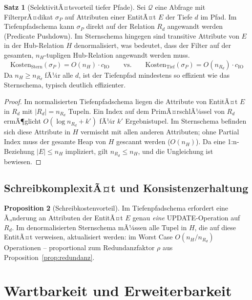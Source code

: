 ﻿\documentclass[a4paper,12pt]{report}
\theoremstyle{definition}
\newtheorem{theorem}{Satz}[chapter]
\newtheorem{proposition}[theorem]{Proposition}
\theoremstyle{remark}
\begin{document}
\begin{theorem}[SelektivitÃ¤tsvorteil tiefer Pfade]
\label{thm:selektivitaet}
Sei $\mathcal{Q}$ eine Abfrage mit FilterprÃ¤dikat $\sigma_P$ auf Attributen
einer EntitÃ¤t $E$ der Tiefe $d$ im Pfad. Im Tiefenpfadschema kann $\sigma_P$
direkt auf der Relation $R_d$ angewandt werden (Predicate Pushdown).
Im Sternschema hingegen sind transitive Attribute von $E$ in der Hub-Relation
$H$ de\-normalisiert, was bedeutet, dass der Filter auf der gesamten,
$n_H$-tupligen Hub-Relation angewandt werden muss.
\[
  \text{Kosten}_{\text{Stern}}(\sigma_P) = O(n_H) \cdot c_{\text{IO}}
  \qquad\text{vs.}\qquad
  \text{Kosten}_{\text{Tief}}(\sigma_P) = O(n_{R_d}) \cdot c_{\text{IO}}
\]
Da $n_H \geq n_{R_d}$ fÃ¼r alle $d$, ist der Tiefenpfad mindestens so
effizient wie das Sternschema, typisch deutlich effizienter.
\end{theorem}

\begin{proof}
Im normalisierten Tiefenpfadschema liegen die Attribute von EntitÃ¤t $E$ in
$R_d$ mit $|R_d| = n_{R_d}$ Tupeln. Ein Index auf dem PrimÃ¤rschlÃ¼ssel von
$R_d$ ermÃ¶glicht $O(\log n_{R_d} + k')$ fÃ¼r $k'$ Ergebnistupel.
Im Sternschema befinden sich diese Attribute in $H$ vermischt mit allen anderen
Attributen; ohne Partial Index muss der gesamte Heap von $H$ gescannt werden
($O(n_H)$). Da eine 1:n-Beziehung $|E| \leq n_H$ impliziert, gilt
$n_{R_d} \leq n_H$, und die Ungleichung ist bewiesen.
\end{proof}

\subsection{SchreibkomplexitÃ¤t und Konsistenzerhaltung}

\begin{proposition}[Schreibkostenvorteil]
Im Tiefenpfadschema erfordert eine Ã„nderung an Attributen der EntitÃ¤t $E$
genau \emph{eine} UPDATE-Operation auf $R_d$. Im denormalisierten
Sternschema mÃ¼ssen alle Tupel in $H$, die auf diese EntitÃ¤t verweisen,
aktualisiert werden: im Worst Case $O(n_H / n_{R_d})$ Operationen --
proportional zum Redundanzfaktor $\rho$ aus Proposition~\ref{prop:redundanz}.
\end{proposition}

\section{Wartbarkeit und Erweiterbarkeit}
\label{sec:wartbarkeit}
\end{document}

